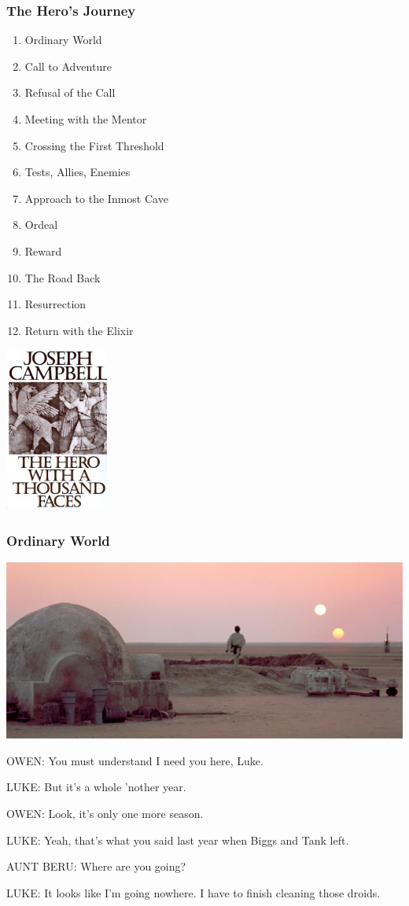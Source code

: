 \documentclass{beamer}
\begin{document}
\begin{frame}\frametitle{The Hero's Journey}
\begin{multicols}{2}
{
\begin{enumerate}
\item Ordinary World
\item Call to Adventure
\item Refusal of the Call
\item Meeting with the Mentor
\item Crossing the First Threshold
\item Tests, Allies, Enemies
\item Approach to the Inmost Cave
\item Ordeal
\item Reward
\item The Road Back
\item Resurrection
\item Return with the Elixir
\end{enumerate}
}
\columnbreak
\includegraphics[scale=3]{herowithathousandfaces.jpg}
\end{multicols}



\end{frame}
\begin{frame}\frametitle{Ordinary World}

{\small
\includegraphics[width=\textwidth]{lukeshome.jpg}

OWEN: You must understand I need you here, Luke.

LUKE: But it's a whole 'nother year.

OWEN: Look, it's only one more season.


LUKE: Yeah, that's what you said last year when Biggs and Tank left.


AUNT BERU: Where are you going?


LUKE: It looks like I'm going nowhere. I have to finish cleaning those
droids.
}
\end{frame}
\end{document}
